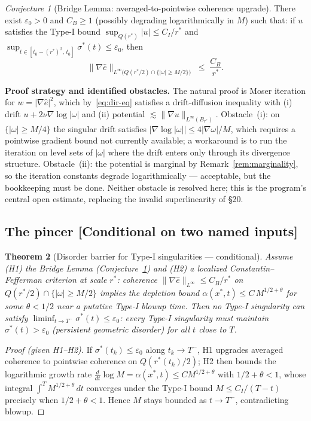 \documentclass[11pt]{article}
\newtheorem{theorem}{Theorem}[section]
\theoremstyle{definition}
\theoremstyle{remark}
\newtheorem{conjecture}[theorem]{Conjecture}
\begin{document}
\begin{conjecture}[Bridge Lemma: averaged-to-pointwise coherence upgrade]
  \label{conj:bridge}
  There exist $\varepsilon_0>0$ and $C_B\geq 1$ (possibly degrading
  logarithmically in $M$) such that: if $u$ satisfies the Type-I bound
  $\sup_{Q(r^*)}|u|\leq C_I/r^*$ and
  $\sup_{t\in[t_0-(r^*)^2,\,t_0]}\sigma^*(t)\leq\varepsilon_0$, then
  \[
    \|\nabla\hat{e}\|_{L^\infty\bigl(Q(r^*/2)\cap\{|\omega|\geq M/2\}\bigr)}
    \;\leq\; \frac{C_B}{r^*}.
  \]
\end{conjecture}

\noindent\textbf{Proof strategy and identified obstacles.} The natural proof
is Moser iteration for $w=|\nabla\hat{e}|^2$, which
by~\eqref{eq:dir-eq} satisfies a drift-diffusion inequality with (i) drift
$u + 2\nu\nabla\log|\omega|$ and (ii) potential
$\lesssim\|\nabla u\|_{L^\infty(B_{r^*})}$. Obstacle~(i): on
$\{|\omega|\geq M/4\}$ the singular drift satisfies
$|\nabla\log|\omega||\leq 4|\nabla\omega|/M$, which requires a pointwise
gradient bound not currently available; a workaround is to run the iteration
on level sets of $|\omega|$ where the drift enters only through its
divergence structure. Obstacle~(ii): the potential is marginal by
Remark~\ref{rem:marginality}, so the iteration constants degrade
logarithmically --- acceptable, but the bookkeeping must be done. Neither
obstacle is resolved here; this is the program's central open estimate,
replacing the invalid superlinearity of \S20.

\subsection{The pincer [Conditional on two named inputs]}

\begin{theorem}[Disorder barrier for Type-I singularities --- conditional]
  \label{thm:pincer-conditional}
  Assume (H1) the Bridge Lemma (Conjecture~\ref{conj:bridge}) and (H2) a
  localized Constantin--Fefferman criterion at scale $r^*$: coherence
  $\|\nabla\hat{e}\|_{L^\infty}\leq C_B/r^*$ on
  $Q(r^*/2)\cap\{|\omega|\geq M/2\}$ implies the depletion bound
  $\alpha(x^*,t)\leq C\,M^{1/2+\theta}$ for some $\theta<1/2$ near a
  putative Type-I blowup time. Then no Type-I singularity can satisfy
  $\liminf_{t\to T^-}\sigma^*(t)\leq\varepsilon_0$: every Type-I singularity
  must maintain $\sigma^*(t)>\varepsilon_0$ (persistent geometric disorder)
  for all $t$ close to $T$.
\end{theorem}
\begin{proof}[Proof (given H1--H2)]
  If $\sigma^*(t_k)\leq\varepsilon_0$ along $t_k\to T^-$, H1 upgrades
  averaged coherence to pointwise coherence on $Q(r^*(t_k)/2)$; H2 then
  bounds the logarithmic growth rate $\tfrac{d}{dt}\log M = \alpha(x^*,t)
  \leq CM^{1/2+\theta}$ with $1/2+\theta<1$, whose integral
  $\int^{T}M^{1/2+\theta}\,dt$ converges under the Type-I bound
  $M\leq C_I/(T-t)$ precisely when $1/2+\theta<1$. Hence $M$ stays bounded
  as $t\to T^-$, contradicting blowup.
\end{proof}
\end{document}
